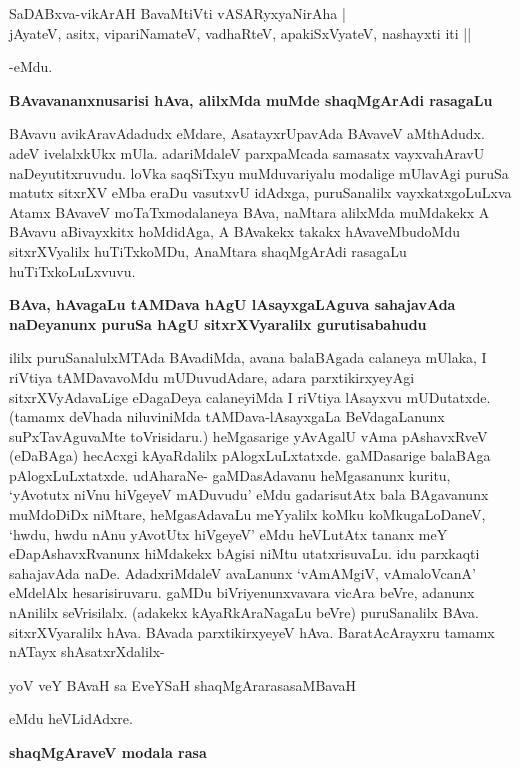 \begin{shloka}
SaDABxva-vikArAH BavaMtiVti vASARyxyaNirAha | \\
jAyateV, asitx, vipariNamateV, vadhaRteV, apakiSxVyateV, nashayxti iti || 
\end{shloka}
\noindent
-eMdu.

{\medskip
\noindent
{\large\bf BAvavananxnusarisi hAva, alilxMda muMde shaqMgArAdi rasagaLu}}\label{page226}
\medskip

\noindent
BAvavu avikAravAdadudx eMdare, AsatayxrUpavAda BAvaveV aMthAdudx. adeV ivelalxkUkx mUla. adariMdaleV parxpaMcada samasatx vayxvahAravU naDeyutitxruvudu. loVka saqSiTxyu muMduvariyalu modalige mUlavAgi puruSa matutx sitxrXV eMba eraDu vasutxvU idAdxga, puruSanalilx vayxkatxgoLuLxva Atamx BAvaveV moTaTxmodalaneya BAva, naMtara alilxMda muMdakekx A BAvavu aBivayxkitx hoMdidAga, A BAvakekx takakx hAvaveMbudoMdu sitxrXVyalilx huTiTxkoMDu, AnaMtara shaqMgArAdi rasagaLu huTiTxkoLuLxvuvu.

{\bigskip
\noindent
{\large\bf BAva, hAvagaLu tAMDava hAgU lAsayxgaLAguva sahajavAda naDeyanunx puruSa hAgU sitxrXVyaralilx gurutisabahudu}}\label{page226a}
\medskip

\noindent
ililx puruSanalulxMTAda BAvadiMda, avana balaBAgada calaneya mUlaka, I riVtiya tAMDavavoMdu mUDuvudAdare, adara parxtikirxyeyAgi sitxrXVyAdavaLige eDagaDeya calaneyiMda I riVtiya lAsayxvu mUDutatxde. (tamamx deVhada niluviniMda tAMDava-lAsayxgaLa BeVdagaLanunx suPxTavAguvaMte toVrisidaru.) heMgasarige yAvAgalU vAma pAshavxRveV (eDaBAga) hecAcxgi kAyaRdalilx pAlogxLuLxtatxde. gaMDasarige balaBAga pAlogxLuLxtatxde. udAharaNe- gaMDasAdavanu heMgasanunx \hbox{kuritu}, `yAvotutx niVnu hiVgeyeV mADuvudu' eMdu gadarisutAtx bala BAgavanunx muMdoDiDx niMtare, heMgasAdavaLu meYyalilx koMku koMkugaLoDaneV, `hwdu, hwdu nAnu yAvotUtx hiVgeyeV' eMdu heVLutAtx tananx meY eDapAshavxRvanunx hiMdakekx bAgisi niMtu utatxrisuvaLu. idu parxkaqti sahajavAda naDe. AdadxriMdaleV avaLanunx `vAmAMgiV, vAmaloVcanA' eMdelAlx hesarisiruvaru. gaMDu biVriyenunxvavara vicAra beVre, adanunx nAnililx seVrisilalx. (adakekx kAyaRkAraNagaLu beVre) puruSanalilx BAva. sitxrXVyaralilx hAva. BAvada parxtikirxyeyeV hAva. BaratAcArayxru tamamx nATayx shAsatxrXdalilx-

\begin{shloka} 
yoV veY BAvaH sa EveYSaH shaqMgArarasasaMBavaH\label{227}
\end{shloka}

eMdu heVLidAdxre.

{\bigskip
\noindent
{\large\bf shaqMgAraveV modala rasa}}\label{page227}
\medskip

